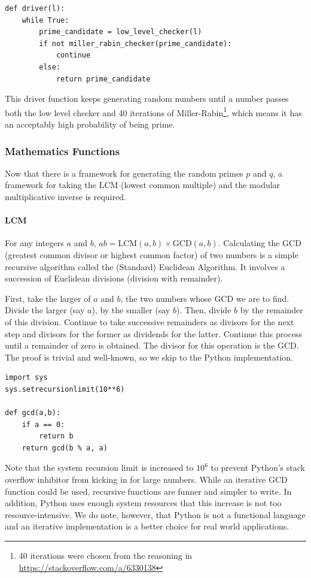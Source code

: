 \documentclass{article}
\begin{document}
\begin{verbatim}
def driver(l):
    while True:
        prime_candidate = low_level_checker(l)
        if not miller_rabin_checker(prime_candidate):
            continue
        else:
            return prime_candidate
\end{verbatim}

This driver function keeps generating random numbers until a number passes both the low level
checker and 40 iterations of Miller-Rabin\footnote{40 iterations were chosen from the reasoning in
\url{https://stackoverflow.com/a/6330138}}, which means it has an acceptably high probability of
being prime.

\subsubsection{Mathematics Functions}
Now that there is a framework for generating the random primes $p$ and $q$, a framework for taking
the LCM (lowest common multiple) and the modular multiplicative inverse is required.

\paragraph{LCM} For any integers $a$ and $b$, $ab = \mathrm{LCM}(a,b) \times \mathrm{GCD}(a,b)$.
Calculating the GCD (greatest common divisor or highest common factor) of two numbers is a simple
recursive algorithm called the (Standard) Euclidean Algorithm. It involves a succession of Euclidean
divisions (division with remainder).

First, take the larger of $a$ and $b$, the two numbers whose GCD we are to find. Divide the larger
(say $a$), by the smaller (say $b$). Then, divide $b$ by the remainder of this division. Continue to
take successive remainders as divisors for the next step and divisors for the former as dividends
for the latter. Continue this process until a remainder of zero is obtained. The divisor for this
operation is the GCD. The proof is trivial and well-known, so we skip to the Python implementation.

\begin{verbatim}
import sys
sys.setrecursionlimit(10**6)

def gcd(a,b):
    if a == 0:
        return b
    return gcd(b % a, a)
\end{verbatim}

Note that the system recursion limit is increased to $10^6$ to prevent Python's stack overflow
inhibitor from kicking in for large numbers. While an iterative GCD function could be used,
recursive functions are funner and simpler to write. In addition, Python uses enough system
resources that this increase is not too resource-intensive. We do note, however, that Python is not
a functional language and an iterative implementation is a better choice for real world
applications.
\end{document}
